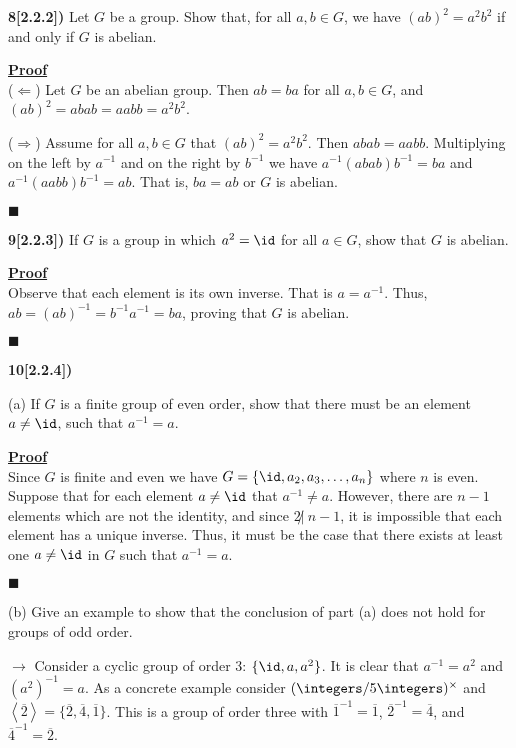 \documentclass[12pt,a4paper]{article}
\newcommand{\prob}[2]{\textbf{#1)} #2}
\newenvironment{proof}
{
\textbf{\underline{Proof}} \\
}
{
\begin{flushright}
$\blacksquare$
\end{flushright}}
\begin{document}
\prob{8[2.2.2]}{Let $G$ be a group. Show that, for all $a,b\in G$, we have $(ab)^2 = a^2b^2$ if and only if $G$ is abelian.}

\begin{proof}
($\Leftarrow$) Let $G$ be an abelian group. Then $ab = ba$ for all $a,b \in G$, and $(ab)^2 = abab = aabb = a^2b^2$.

($\Rightarrow$) Assume for all $a,b \in G$ that $(ab)^2 = a^2b^2$. Then $abab = aabb$. Multiplying on the left by $a^{-1}$ and on the right by $b^{-1}$ we have $a^{-1}(abab)b^{-1} = ba$ and $a^{-1}(aabb)b^{-1} = ab$. That is, $ba = ab$ or $G$ is abelian.
\end{proof}

\prob{9[2.2.3]}{If $G$ is a group in which $a^2 = \id$ for all $a \in G$, show that $G$ is abelian.}

\begin{proof}
Observe that each element is its own inverse. That is $a=a^{-1}$. Thus, $ab = (ab)^{-1} = b^{-1}a^{-1} = ba$, proving that $G$ is abelian.
\end{proof}

\prob{10[2.2.4]}{}

(a) If $G$ is a finite group of even order, show that there must be an element $a \not= \id$, such that $a^{-1} = a$. 

\begin{proof}
Since $G$ is finite and even we have $G = \{\id,a_2,a_3,\hdots,a_n\}$ where $n$ is even. Suppose that for each element $a \not= \id$ that $a^{-1} \not= a$. However, there are $n-1$ elements which are not the identity, and since $2 \not|~n-1$, it is impossible that each element has a unique inverse. Thus, it must be the case that there exists at least one $a \not= \id$ in $G$ such that $a^{-1} = a$.
\end{proof}

(b) Give an example to show that the conclusion of part (a) does not hold for groups of odd order.

$\rightarrow$ Consider a cyclic group of order 3: $\{\id,a,a^2\}$. It is clear that $a^{-1} = a^2$ and $(a^{2})^{-1} = a$. As a concrete example consider $(\integers/5\integers)^{\times}$ and $\left<\overline{2}\right> = \{\overline{2},\overline{4},\overline{1}\}$. This is a group of order three with $\overline{1}^{-1} = \overline{1}$, $\overline{2}^{-1} = \overline{4}$, and $\overline{4}^{-1} = \overline{2}$.
\end{document}
